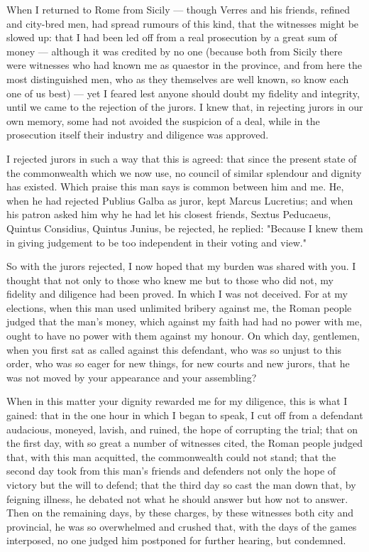  When I returned to Rome from Sicily --- though Verres and his friends, refined and city-bred men, had spread rumours of this kind, that the witnesses might be slowed up: that I had been led off from a real prosecution by a great sum of money --- although it was credited by no one (because both from Sicily there were witnesses who had known me as quaestor in the province, and from here the most distinguished men, who as they themselves are well known, so know each one of us best) --- yet I feared lest anyone should doubt my fidelity and integrity, until we came to the rejection of the jurors. I knew that, in rejecting jurors in our own memory, some had not avoided the suspicion of a deal, while in the prosecution itself their industry and diligence was approved.

 I rejected jurors in such a way that this is agreed: that since the present state of the commonwealth which we now use, no council of similar splendour and dignity has existed. Which praise this man says is common between him and me. He, when he had rejected Publius Galba as juror, kept Marcus Lucretius; and when his patron asked him why he had let his closest friends, Sextus Peducaeus, Quintus Considius, Quintus Junius, be rejected, he replied: "Because I knew them in giving judgement to be too independent in their voting and view."

 So with the jurors rejected, I now hoped that my burden was shared with you. I thought that not only to those who knew me but to those who did not, my fidelity and diligence had been proved. In which I was not deceived. For at my elections, when this man used unlimited bribery against me, the Roman people judged that the man's money, which against my faith had had no power with me, ought to have no power with them against my honour. On which day, gentlemen, when you first sat as called against this defendant, who was so unjust to this order, who was so eager for new things, for new courts and new jurors, that he was not moved by your appearance and your assembling?

 When in this matter your dignity rewarded me for my diligence, this is what I gained: that in the one hour in which I began to speak, I cut off from a defendant audacious, moneyed, lavish, and ruined, the hope of corrupting the trial; that on the first day, with so great a number of witnesses cited, the Roman people judged that, with this man acquitted, the commonwealth could not stand; that the second day took from this man's friends and defenders not only the hope of victory but the will to defend; that the third day so cast the man down that, by feigning illness, he debated not what he should answer but how not to answer. Then on the remaining days, by these charges, by these witnesses both city and provincial, he was so overwhelmed and crushed that, with the days of the games interposed, no one judged him postponed for further hearing, but condemned.

